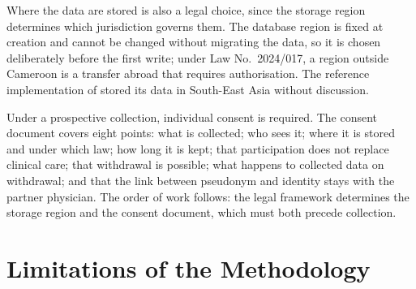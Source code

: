 Where the data are stored is also a legal choice, since the storage region determines which jurisdiction governs them. The database region is fixed at creation and cannot be changed without migrating the data, so it is chosen deliberately before the first write; under Law No.~2024/017, a region outside Cameroon is a transfer abroad that requires authorisation. The reference implementation of \textcite{efendi2025} stored its data in South-East Asia without discussion.

Under a prospective collection, individual consent is required. The consent document covers eight points: what is collected; who sees it; where it is stored and under which law; how long it is kept; that participation does not replace clinical care; that withdrawal is possible; what happens to collected data on withdrawal; and that the link between pseudonym and identity stays with the partner physician. The order of work follows: the legal framework determines the storage region and the consent document, which must both precede collection.

\section{Limitations of the Methodology}\label{sec:meth-limits}

